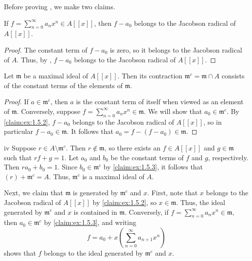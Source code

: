 Before proving , we make two claims.

\begin{claim}
\label{claim:ex:1.5.2}
If \(f = \sum_{n=0}^\infty a_n x^n \in A[[x]]\), then \(f - a_0\) belongs to the Jacobson radical of \(A[[x]]\).
\end{claim}

\begin{proof}
The constant term of \(f - a_0\) is zero, so it belongs to the Jacobson radical of \(A\).
Thus, by , \(f - a_0\) belongs to the Jacobson radical of \(A[[x]]\).
\end{proof}

\begin{claim}
\label{claim:ex:1.5.3}
Let \(\mathfrak{m}\) be a maximal ideal of \(A[[x]]\).
Then its contraction \(\mathfrak{m}^c = \mathfrak{m} \cap A\) consists of the constant terms of the elements of \(\mathfrak{m}\).
\end{claim}

\begin{proof}
If \(a \in \mathfrak{m}^c\), then \(a\) is the constant term of itself when viewed as an element of \(\mathfrak{m}\).
Conversely, suppose \(f = \sum_{n=0}^\infty a_n x^n \in \mathfrak{m}\).
We will show that \(a_0 \in \mathfrak{m}^c\).
By \autoref{claim:ex:1.5.2}, \(f - a_0\) belongs to the Jacobson radical of \(A[[x]]\), so in particular \(f - a_0 \in \mathfrak{m}\).
It follows that \(a_0 = f - (f - a_0) \in \mathfrak{m}\).
\end{proof}

\begin{partsolution}{1}{5}{iv}
Suppose \(r \in A \setminus \mathfrak{m}^c\).
Then \(r \notin \mathfrak{m}\), so there exists an \(f \in A[[x]]\) and \(g \in \mathfrak{m}\) such that \(r f + g = 1\).
Let \(a_0\) and \(b_0\) be the constant terms of \(f\) and \(g\), respectively.
Then \(r a_0 + b_0 = 1\).
Since \(b_0 \in \mathfrak{m}^c\) by \autoref{claim:ex:1.5.3}, it follows that \((r) + \mathfrak{m}^c = A\).
Thus, \(\mathfrak{m}^c\) is a maximal ideal of \(A\).

Next, we claim that \(\mathfrak{m}\) is generated by \(\mathfrak{m}^c\) and \(x\).
First, note that \(x\) belongs to the Jacobson radical of \(A[[x]]\) by \autoref{claim:ex:1.5.2}, so \(x \in \mathfrak{m}\).
Thus, the ideal generated by \(\mathfrak{m}^c\) and \(x\) is contained in \(\mathfrak{m}\).
Conversely, if \(f = \sum_{n=0}^\infty a_n x^n \in \mathfrak{m}\), then \(a_0 \in \mathfrak{m}^c\) by \autoref{claim:ex:1.5.3}, and writing
\begin{equation*}
f = a_0 + x \left(\sum_{n=0}^\infty a_{n+1} x^n\right)
\end{equation*}
shows that \(f\) belongs to the ideal generated by \(\mathfrak{m}^c\) and \(x\).
\end{partsolution}

